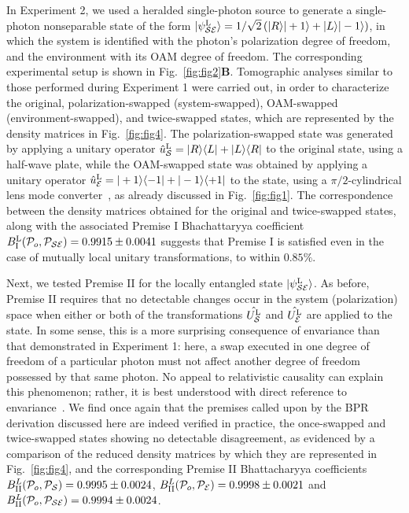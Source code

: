 \documentclass[12pt]{iopart}
\begin{document}
In Experiment 2, we used a heralded single-photon source to generate a single-photon nonseparable state of the form $|\psi_{\cal SE}^\mathrm{L}\rangle= 1/\sqrt{2} \left(|R\rangle |+1\rangle + |L\rangle |-1\rangle \right)$, in which the system is identified with the photon's polarization degree of freedom, and the environment with its OAM degree of freedom. The corresponding experimental setup is shown in Fig.~\ref{fig:fig2}{\bf B}. Tomographic analyses similar to those performed during Experiment 1 were carried out, in order to characterize the original, polarization-swapped (system-swapped), OAM-swapped (environment-swapped), and twice-swapped states, which are represented by the density matrices in Fig.~\ref{fig:fig4}. The polarization-swapped state was generated by applying a unitary operator $\hat{u}_{\cal S}^\mathrm{L}=|R\rangle \langle L|+|L\rangle \langle R|$ to the original state, using a half-wave plate, while the OAM-swapped state was obtained by applying a unitary operator $\hat{u}_{\cal E}^\mathrm{L}=|+1\rangle\langle-1| + |-1\rangle\langle+1|$ to the state, using a $\pi/2$-cylindrical lens mode converter~\cite{allen:92}, as already discussed in Fig.~\ref{fig:fig1}. The correspondence between the density matrices obtained for the original and twice-swapped states, along with the associated Premise I Bhachattaryya coefficient $B^\mathrm{L}_\mathrm{I}({\cal P}_{o},{\cal P}_{{\cal SE}})=0.9915\pm0.0041$ suggests that Premise I is satisfied even in the case of mutually local unitary transformations, to within $0.85\%$. 

Next, we tested Premise II for the locally entangled state $|\psi_{\cal SE}^\mathrm{L}\rangle$. As before, Premise II requires that no detectable changes occur in the system (polarization) space when either or both of the transformations $\hat{U_{\cal S}^\mathrm{L}}$ and $\hat{U_{\cal E}^\mathrm{L}}$ are applied to the state. In some sense, this is a more surprising consequence of envariance than that demonstrated in Experiment 1: here, a swap executed in one degree of freedom of a particular photon must not affect another degree of freedom possessed by that same photon. No appeal to relativistic causality can explain this phenomenon; rather, it is best understood with direct reference to envariance~\cite{footnote:04}. We find once again that the premises called upon by the BPR derivation discussed here are indeed verified in practice, the once-swapped and twice-swapped states showing no detectable disagreement, as evidenced by a comparison of the reduced density matrices by which they are represented in Fig.~\ref{fig:fig4}, and the corresponding Premise II Bhattacharyya coefficients $B^{L}_\mathrm{II}({\cal P}_{o},{\cal P}_{\cal S})=0.9995\pm0.0024$, $B^{L}_\mathrm{II}({\cal P}_{o},{\cal P}_{\cal E})=0.9998\pm0.0021$ and $B^{L}_\mathrm{II}({\cal P}_{o},{\cal P}_{{\cal SE}})=0.9994\pm0.0024$. 
\end{document}
